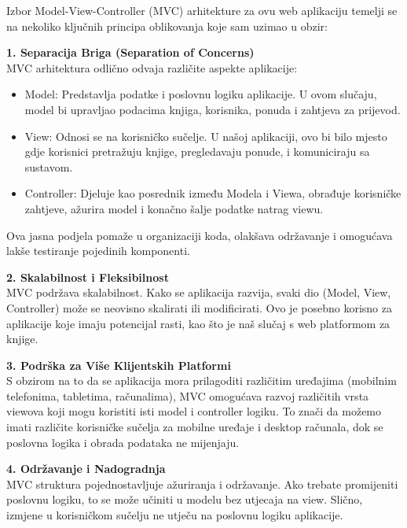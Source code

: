 Izbor Model-View-Controller (MVC) arhitekture za ovu web aplikaciju temelji se na nekoliko ključnih principa oblikovanja koje sam uzimao u obzir:

 \textbf{1. Separacija Briga (Separation of Concerns)}\\

MVC arhitektura odlično odvaja različite aspekte aplikacije:
\begin{itemize}
		  \item {Model: Predstavlja podatke i poslovnu logiku aplikacije. U ovom slučaju, model bi upravljao podacima knjiga, korisnika, ponuda i zahtjeva za prijevod.}
		  \item {View: Odnosi se na korisničko sučelje. U našoj aplikaciji, ovo bi bilo mjesto gdje korisnici pretražuju knjige, pregledavaju ponude, i komuniciraju sa sustavom.}	
            \item {Controller: Djeluje kao posrednik između Modela i Viewa, obrađuje korisničke zahtjeve, ažurira model i konačno šalje podatke natrag viewu.}
	   \end{itemize}

Ova jasna podjela pomaže u organizaciji koda, olakšava održavanje i omogućava lakše testiranje pojedinih komponenti.

 \textbf{2. Skalabilnost i Fleksibilnost}\\

MVC podržava skalabilnost. Kako se aplikacija razvija, svaki dio (Model, View, Controller) može se neovisno skalirati ili modificirati. Ovo je posebno korisno za aplikacije koje imaju potencijal rasti, kao što je naš slučaj s web platformom za knjige.

 \textbf{3. Podrška za Više Klijentskih Platformi}\\

S obzirom na to da se aplikacija mora prilagoditi različitim uređajima (mobilnim telefonima, tabletima, računalima), MVC omogućava razvoj različitih vrsta viewova koji mogu koristiti isti model i controller logiku. To znači da možemo imati različite korisničke sučelja za mobilne uređaje i desktop računala, dok se poslovna logika i obrada podataka ne mijenjaju.

 \textbf{4. Održavanje i Nadogradnja}\\

MVC struktura pojednostavljuje ažuriranja i održavanje. Ako trebate promijeniti poslovnu logiku, to se može učiniti u modelu bez utjecaja na view. Slično, izmjene u korisničkom sučelju ne utječu na poslovnu logiku aplikacije.

